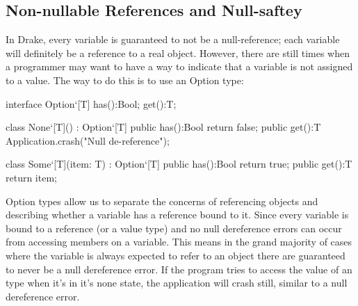 \documentclass{article}
\newcommand{\bt}{\ensuremath{^{\backprime}}}
\newcommand{\code}[1]{\texttt{\StrSubstitute{#1}{`}{\bt}}}
\newcommand{\bcode}[1]{\code{#1}}
\newcommand{\plname}[0]{Drake\xspace}
\begin{document}
\subsection{Non-nullable References and Null-saftey}
In \plname, every variable is guaranteed to not be a null-reference; each variable will definitely be a reference to a real object. However, there are still times when a programmer may want to have a way to indicate that a variable is not assigned to a value. The way to do this is to use an Option type:
\begin{sooplisting}
interface Option`[T] {
	has():Bool;
	get():T;
}

class None`[T]() : Option`[T] {
	public has():Bool { return false; }
	public get():T    { Application.crash("Null de-reference"); }
}

class Some`[T](item: T) : Option`[T] {
	public has():Bool { return true; }
	public get():T    { return item; }
}
\end{sooplisting}
Option types allow us to separate the concerns of referencing objects and describing whether a variable has a reference bound to it. Since every variable is bound to a reference (or a value type) and no null dereference errors can occur from accessing members on a variable. This means in the grand majority of cases where the variable is always expected to refer to an object there are guaranteed to never be a null dereference error. If the program tries to access the value of an \bcode{Option} type when it's in it's none state, the application will crash still, similar to a null dereference error.

\pagebreak
\end{document}
